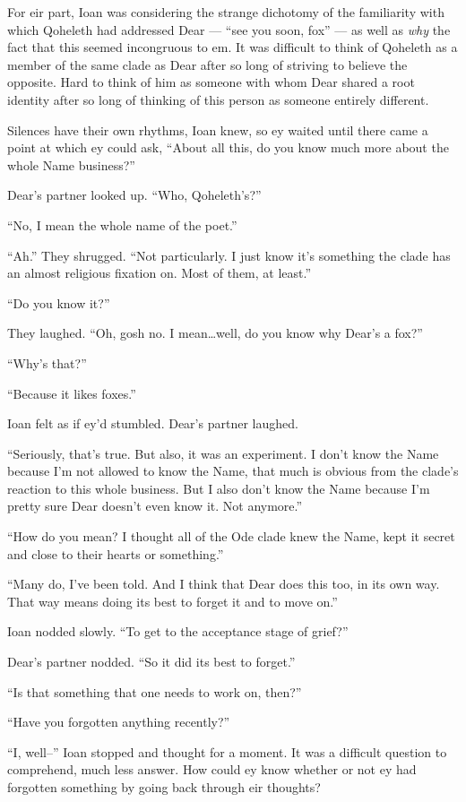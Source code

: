 For eir part, Ioan was considering the strange dichotomy of the familiarity with which Qoheleth had addressed Dear — ``see you soon, fox'' — as well as \emph{why} the fact that this seemed incongruous to em. It was difficult to think of Qoheleth as a member of the same clade as Dear after so long of striving to believe the opposite. Hard to think of him as someone with whom Dear shared a root identity after so long of thinking of this person as someone entirely different.

Silences have their own rhythms, Ioan knew, so ey waited until there came a point at which ey could ask, ``About all this, do you know much more about the whole Name business?''

Dear's partner looked up. ``Who, Qoheleth's?''

``No, I mean the whole name of the poet.''

``Ah.'' They shrugged. ``Not particularly. I just know it's something the clade has an almost religious fixation on. Most of them, at least.''

``Do you know it?''

They laughed. ``Oh, gosh no. I mean\ldots{}well, do you know why Dear's a fox?''

``Why's that?''

``Because it likes foxes.''

Ioan felt as if ey'd stumbled. Dear's partner laughed.

``Seriously, that's true. But also, it was an experiment. I don't know the Name because I'm not allowed to know the Name, that much is obvious from the clade's reaction to this whole business. But I also don't know the Name because I'm pretty sure Dear doesn't even know it. Not anymore.''

``How do you mean? I thought all of the Ode clade knew the Name, kept it secret and close to their hearts or something.''

``Many do, I've been told. And I think that Dear does this too, in its own way. That way means doing its best to forget it and to move on.''

Ioan nodded slowly. ``To get to the acceptance stage of grief?''

Dear's partner nodded. ``So it did its best to forget.''

``Is that something that one needs to work on, then?''

``Have you forgotten anything recently?''

``I, well--'' Ioan stopped and thought for a moment. It was a difficult question to comprehend, much less answer. How could ey know whether or not ey had forgotten something by going back through eir thoughts?

